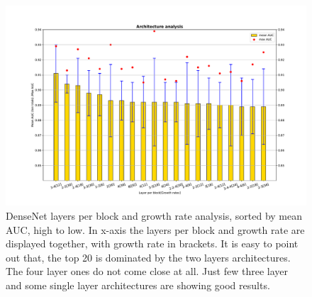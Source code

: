 
\begin{center}
  \begin{figure}[ht]
  \centering
  \includegraphics[width=16cm]{images/densenet/siamese/densenet_siamese_architecture_bar}
  \caption[DenseNet layers per block and growth rate mean AUC analysis]{DenseNet layers per block and growth rate analysis, sorted by mean AUC, high to low. In x-axis the layers per block and growth rate are displayed together, 
  with growth rate in brackets. It is easy to point out that, the top 20 is 
  dominated by the two layers architectures. The four layer ones do not come close at all. Just few three layer and some single layer architectures are showing good results.}
  \label{fig:meanAUC_growth_and_layers}
  \end{figure}
\end{center}

